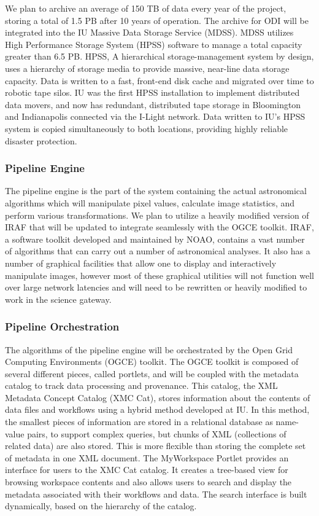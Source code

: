 \documentclass[10pt,conference]{IEEEtran}
\begin{document}
We plan to archive an average of 150 TB of data every year of the project, storing a total of 1.5 PB after 10 years of operation. The archive for ODI will be integrated into the IU Massive Data Storage Service (MDSS). MDSS utilizes High Performance Storage System (HPSS) software to manage a total capacity greater than 6.5 PB. HPSS, A hierarchical storage-management system by design, uses a hierarchy of storage media to provide massive, near-line data storage capacity. Data is written to a fast, front-end disk cache and migrated over time to robotic tape silos. IU was the first HPSS installation to implement distributed data movers, and now has redundant, distributed tape storage in Bloomington and Indianapolis connected via the I-Light network. Data written to IU's HPSS system is copied simultaneously to both locations, providing highly reliable disaster protection. 

\subsubsection{Pipeline Engine}

The pipeline engine is the part of the system containing the actual astronomical algorithms which will manipulate pixel values, calculate image statistics, and perform various transformations. We plan to utilize a heavily modified version of IRAF that will be updated to integrate seamlessly with the OGCE toolkit. IRAF, a software toolkit developed and maintained by NOAO, contains a vast number of algorithms that can carry out a number of astronomical analyses. It also has a number of graphical facilities that allow one to display and interactively manipulate images, however most of these graphical utilities will not function well over large network latencies and will need to be rewritten or heavily modified to work in the science gateway. 

\subsubsection{Pipeline Orchestration}

The algorithms of the pipeline engine will be orchestrated by the Open Grid Computing Environments (OGCE) toolkit. The OGCE toolkit is composed of several different pieces, called portlets, and will be coupled with the metadata catalog to track data processing and provenance. This catalog, the XML Metadata Concept Catalog (XMC Cat)\cite{jensen2008}, stores information about the contents of data files and workflows using a hybrid method developed at IU. In this method, the smallest pieces of information are stored in a relational database as name-value pairs, to support complex queries, but chunks of XML (collections of related data) are also stored. This is more flexible than storing the complete set of metadata in one XML document. The MyWorkspace Portlet provides an interface for users to the XMC Cat catalog. It creates a tree-based view for browsing workspace contents and also allows users to search and display the metadata associated with their workflows and data. The search interface is built dynamically, based on the hierarchy of the catalog. 
\end{document}
